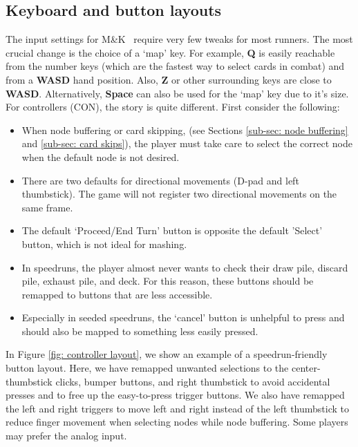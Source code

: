 \documentclass[12pt]{amsart}
\newcommand{\mk}{\textsf{M\&K}}
\newcommand{\con}{\textsf{CON}}
\begin{document}
\subsection{Keyboard and button layouts}
The input settings for \mk~ require very few tweaks for most runners.  
The most crucial change is the choice of a `map' key.  
For example, \textbf{Q} is easily reachable from the number keys (which are the fastest way to select cards in combat) and from a \textbf{WASD} hand position. 
Also, \textbf{Z} or other surrounding keys are close to \textbf{WASD}.  
Alternatively, \textbf{Space} can also be used for the `map' key due to it's size.  \\

For controllers (\con), the story is quite different.  
First consider the following: 
\begin{itemize}
    \item 
        When node buffering or card skipping, (see Sections \ref{sub-sec: node buffering} and \ref{sub-sec: card skips}), the player must take care to select the correct node when the default node is not desired.  
    \item 
        There are two defaults for directional movements (D-pad and left thumbstick).  
        The game will not register two directional movements on the same frame.  
    \item 
       The default `Proceed/End Turn' button is opposite the default 'Select' button, which is not ideal for mashing.  
    \item 
        In speedruns, the player almost never wants to check their draw pile, discard pile, exhaust pile, and deck.  
        For this reason, these buttons should be remapped to buttons that are less accessible.  
    \item 
        Especially in seeded speedruns, the `cancel' button is unhelpful to press and should also be mapped to something less easily pressed.  
\end{itemize}
In Figure \ref{fig: controller layout}, we show an example of a speedrun-friendly button layout.  
Here, we have remapped unwanted selections to the center-thumbstick clicks, bumper buttons, and right thumbstick to avoid accidental presses and to free up the easy-to-press trigger buttons.  
We also have remapped the left and right triggers to move left and right instead of the left thumbstick to reduce finger movement when selecting nodes while node buffering.  
Some players may prefer the analog input.  
\end{document}
